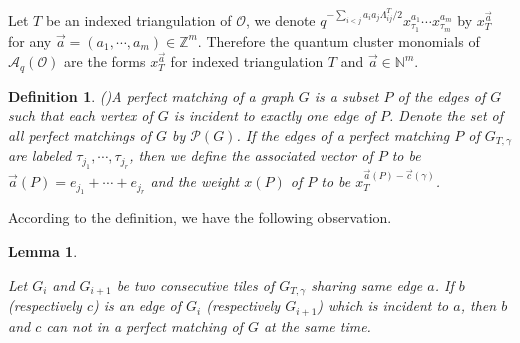 \documentclass[10pt]{amsart}
\theoremstyle{theorems}
\newtheorem{Lemma}[Theorem]{Lemma}
\newtheorem{Definition}[Theorem]{Definition}
\begin{document}
\medskip

Let $T$ be an indexed triangulation of $\mathcal O$, we denote $q^{-\sum_{i<j}a_ia_j\Lambda^T_{ij}/2}x^{a_1}_{\tau_1}\cdots x^{a_m}_{\tau_m}$ by $x_T^{\vec{a}}$ for any $\vec{a}=(a_1,\cdots,a_m)\in \mathbb Z^m$. Therefore the quantum cluster monomials of $\mathcal A_q(\mathcal O)$ are the forms $x_T^{\vec{a}}$ for indexed triangulation $T$ and $\vec{a}\in \mathbb N^m$.

\medskip

\begin{Definition}(\cite[Definition 4.6]{MSW})\label{perctvec}
A \emph{perfect matching} of a graph $G$ is a subset $P$ of the edges of $G$ such that each vertex of $G$ is incident to exactly one edge of $P$. Denote the set of all perfect matchings of $G$ by $\mathcal P(G)$. If the edges of a perfect matching $P$ of $G_{T,\gamma}$ are labeled $\tau_{j_1},\cdots, \tau_{j_r}$, then we define the \emph{associated vector} of $P$ to be $\vec{a}(P)=e_{j_1}+\cdots+e_{j_r}$ and the \emph{weight} $x(P)$ of $P$ to be $x_T^{\vec{a}(P)-\vec{c}(\gamma)}$.

\end{Definition}

\medskip

According to the definition, we have the following observation.

\medskip

\begin{Lemma}\label{inone}

Let $G_i$ and $G_{i+1}$ be two consecutive tiles of $G_{T,\gamma}$ sharing same edge $a$. If $b$ (respectively $c$) is an edge of $G_i$ (respectively $G_{i+1}$) which is incident to $a$, then $b$ and $c$ can not in a perfect matching of $G$ at the same time.

\end{Lemma}
\end{document}

